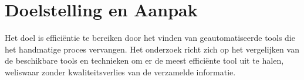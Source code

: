 
\section{Doelstelling en Aanpak}
Het doel is efficiëntie te bereiken door het vinden van geautomatiseerde tools die het handmatige proces vervangen. 
Het onderzoek richt zich op het vergelijken van de beschikbare tools en technieken om er de meest efficiënte tool uit te halen, weliswaar zonder kwaliteitsverlies van de verzamelde informatie.





